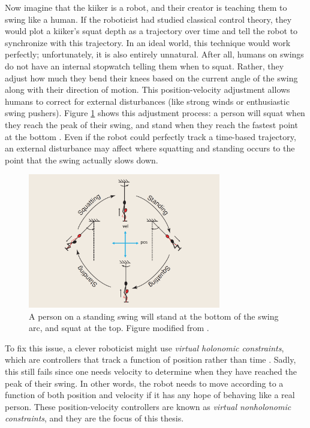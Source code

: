 Now imagine that the kiiker is a robot, and their creator is teaching them to
swing like a human.
If the roboticist had studied classical control theory, they would plot 
a kiiker's squat depth as a trajectory over time and tell the robot to
synchronize with this trajectory.
In an ideal world, this technique would work perfectly; unfortunately, it is
also entirely unnatural. 
After all, humans on swings do not have an internal stopwatch telling them when
to squat.
Rather, they adjust how much they bend their knees based on the current angle of
the swing along with their direction of motion.
This position-velocity adjustment allows humans to correct for external
disturbances (like strong winds or enthusiastic swing pushers). 
Figure \ref{fig:swing-pos-vel} shows this adjustment process:
a person will squat when they reach the peak of their swing, and
stand when they reach the fastest point at the bottom
\cite{pumping_swing_standing_squatting}.
Even if the robot could perfectly track a time-based trajectory, an external
disturbance may affect where squatting and standing occurs to the point that
the swing actually slows down.

\begin{figure}
    \centering
    \includegraphics[width=0.75\textwidth]{images/swing_pos_vel.png}
    \caption{A person on a standing swing will stand at the bottom of the swing
        arc, and squat at the top. Figure modified from
        \cite{pumping_swing_standing_squatting}.}
    \label{fig:swing-pos-vel}
\end{figure}

To fix this issue, a clever roboticist might use \textit{virtual holonomic
constraints}, which are controllers that track a function of position rather
than time \cite{vhcs_for_el_systems}.
Sadly, this still fails since one needs velocity to determine when they
have reached the peak of their swing.
In other words, the robot needs to move according to a function of both position
and velocity if it has any hope of behaving like a real person.
These position-velocity controllers are known as 
\textit{virtual nonholonomic constraints}, and they are the focus of this
thesis.

